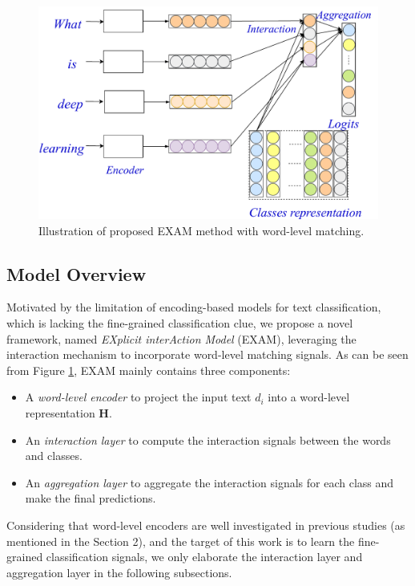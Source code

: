 \documentclass[letterpaper]{article} %
\begin{document}
\begin{figure}[tbp] \centering  
	\includegraphics[width=0.95\columnwidth]{fig1b.pdf}   
	\caption{Illustration of proposed EXAM method with word-level matching.} 
    	\label{exama}
\end{figure}
 
\subsection{Model Overview}
Motivated by the limitation of encoding-based models for text classification, which is lacking the fine-grained classification clue, we propose a novel framework, named \textit{EXplicit interAction Model} (EXAM), leveraging the interaction mechanism to incorporate word-level matching signals. As can be seen from Figure \ref{exama}, EXAM mainly contains three components:
\begin{itemize}
\item A \textit{word-level encoder} to project the input text $d_i$ into a word-level representation $\mathbf{H}$.
\item An \textit{interaction layer} to compute the interaction signals between the words and classes.
\item An \textit{aggregation layer} to aggregate the interaction signals for each class and make the final predictions.
\end{itemize}

Considering that word-level encoders are well investigated in previous studies (as mentioned in the Section 2), and the target of this work is to learn the fine-grained classification signals, we only elaborate the interaction layer and aggregation layer in the following subsections.
\end{document}
